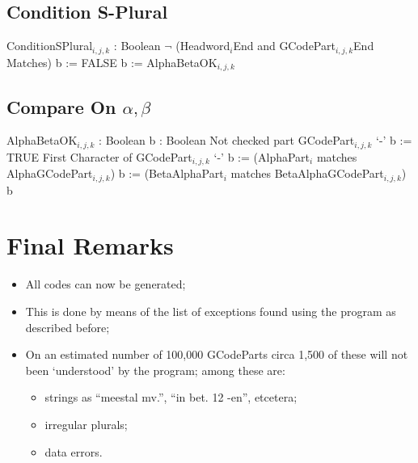 \subsection{Condition S-Plural}

  ConditionSPlural$_{i,j,k}$ : Boolean 
  
    $\neg$ (Headword$_i$End and GCodePart$_{i,j,k}$End Matches) 
    b := FALSE
  
    b := AlphaBetaOK$_{i,j,k}$
  
  

\subsection{Compare On $\alpha, \beta$}

  AlphaBetaOK$_{i,j,k}$ : Boolean 
    b : Boolean
 
    Not checked part GCodePart$_{i,j,k}$  `-' 
    b := TRUE
   First Character of GCodePart$_{i,j,k}$  `-' 
    b := (AlphaPart$_i$ matches AlphaGCodePart$_{i,j,k}$)
  
    b := (BetaAlphaPart$_i$ matches BetaAlphaGCodePart$_{i,j,k}$)
  
    b
  

\newpage
\section{Final Remarks}

\begin{itemize}
 \item All codes can now be generated;
 \item This is done by means of the list of exceptions found using the program 
       as described before;
 \item On an estimated number of 100,000 GCodeParts circa 1,500 of these will 
       not been `understood' by the program; among these are:
   \begin{itemize}
    \item strings as ``meestal mv.'',  ``in bet. 12 -en'', etcetera;
    \item irregular plurals;
    \item data errors.
   \end{itemize}
\end{itemize}

